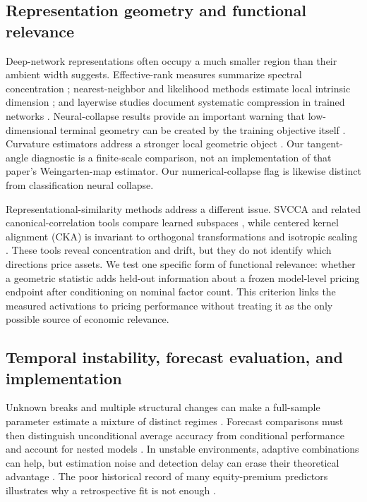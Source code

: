 \subsection{Representation geometry and functional relevance}

Deep-network representations often occupy a much smaller region than their ambient width suggests. Effective-rank measures summarize spectral concentration \citep{roy2007rank}; nearest-neighbor and likelihood methods estimate local intrinsic dimension \citep{levina2005mle,facco2017twonn}; and layerwise studies document systematic compression in trained networks \citep{ansuini2019intrinsic}. Neural-collapse results provide an important warning that low-dimensional terminal geometry can be created by the training objective itself \citep{papyan2020collapse}. Curvature estimators address a stronger local geometric object \citep{cao2021curvature}. Our tangent-angle diagnostic is a finite-scale comparison, not an implementation of that paper's Weingarten-map estimator. Our numerical-collapse flag is likewise distinct from classification neural collapse.

Representational-similarity methods address a different issue. SVCCA and related canonical-correlation tools compare learned subspaces \citep{raghu2017svcca,morcos2018cca}, while centered kernel alignment (CKA) is invariant to orthogonal transformations and isotropic scaling \citep{kornblith2019similarity}. These tools reveal concentration and drift, but they do not identify which directions price assets. We test one specific form of functional relevance: whether a geometric statistic adds held-out information about a frozen model-level pricing endpoint after conditioning on nominal factor count. This criterion links the measured activations to pricing performance without treating it as the only possible source of economic relevance.

\subsection{Temporal instability, forecast evaluation, and implementation}

Unknown breaks and multiple structural changes can make a full-sample parameter estimate a mixture of distinct regimes \citep{andrews1993instability,bai1998breaks}. Forecast comparisons must then distinguish unconditional average accuracy from conditional performance and account for nested models \citep{diebold1995accuracy,clark2001nested,giacomini2006conditional}. In unstable environments, adaptive combinations can help, but estimation noise and detection delay can erase their theoretical advantage \citep{elliott2004combinations,giacomini2010unstable,smith2021break}. The poor historical record of many equity-premium predictors illustrates why a retrospective fit is not enough \citep{welch2008equity}.

